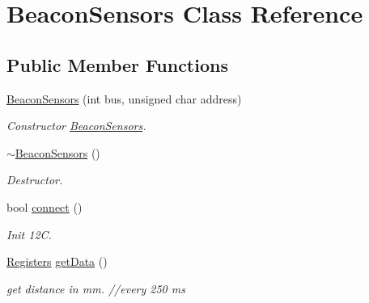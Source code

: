 \hypertarget{classBeaconSensors}{}\section{Beacon\+Sensors Class Reference}
\label{classBeaconSensors}
\subsection*{Public Member Functions}
\begin{DoxyCompactItemize}
\item 
\mbox{\label{classBeaconSensors_ae88c123cdeac6ee17c034a239bd38705}} 
\hyperlink{classBeaconSensors_ae88c123cdeac6ee17c034a239bd38705}{Beacon\+Sensors} (int bus, unsigned char address)
\begin{DoxyCompactList}\small\item\em Constructor \hyperlink{classBeaconSensors}{Beacon\+Sensors}. \end{DoxyCompactList}\item 
\mbox{\label{classBeaconSensors_af3000d9ede6ec7c440320cccdca98a96}} 
\hyperlink{classBeaconSensors_af3000d9ede6ec7c440320cccdca98a96}{$\sim$\+Beacon\+Sensors} ()
\begin{DoxyCompactList}\small\item\em Destructor. \end{DoxyCompactList}\item 
\mbox{\label{classBeaconSensors_a9d5aaead78f631bae02da430bb4e400e}} 
bool \hyperlink{classBeaconSensors_a9d5aaead78f631bae02da430bb4e400e}{connect} ()
\begin{DoxyCompactList}\small\item\em Init 12C. \end{DoxyCompactList}\item 
\mbox{\label{classBeaconSensors_a0fc052c2c3d6236020384847f1dd8d53}} 
\hyperlink{structRegisters}{Registers} \hyperlink{classBeaconSensors_a0fc052c2c3d6236020384847f1dd8d53}{get\+Data} ()
\begin{DoxyCompactList}\small\item\em get distance in mm. //every 250 ms \end{DoxyCompactList}\item 
\mbox{\label{classBeaconSensors_a1b1f41a7637ff58ccabc17fccb22b87c}} 

\end{DoxyCompactItemize}
